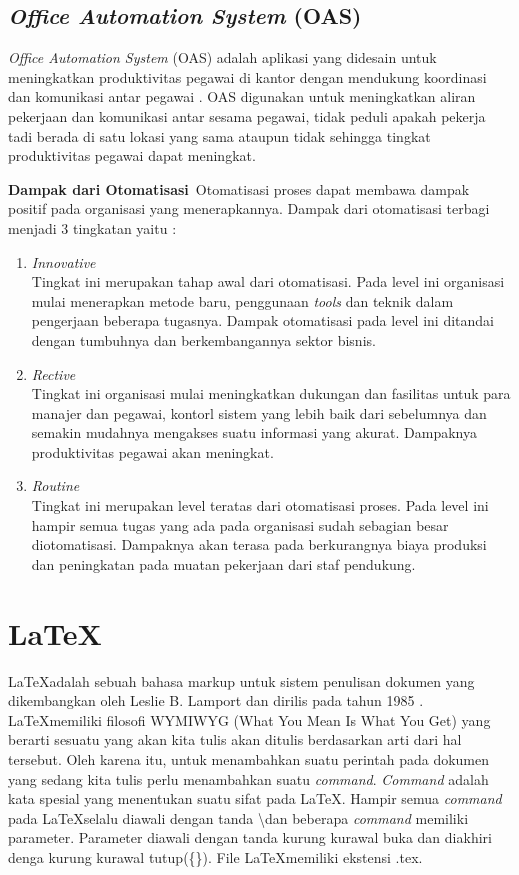 \subsection{\textit{Office Automation System} (OAS)}
\label{sec:oas}
\textit{Office Automation System} (OAS) adalah aplikasi yang didesain untuk meningkatkan produktivitas pegawai di kantor dengan mendukung koordinasi dan komunikasi antar pegawai \cite{Laudon:1996}. OAS digunakan untuk meningkatkan aliran pekerjaan dan komunikasi antar sesama pegawai, tidak peduli apakah pekerja tadi berada di satu lokasi yang sama ataupun tidak sehingga tingkat produktivitas pegawai dapat meningkat.

\textbf{Dampak dari Otomatisasi}\
Otomatisasi proses dapat membawa dampak positif pada organisasi yang menerapkannya. Dampak dari otomatisasi terbagi menjadi 3 tingkatan yaitu \cite{Susan:1982}: 
\begin{enumerate}
	\item \textit{Innovative}\\
	Tingkat ini merupakan tahap awal dari otomatisasi. Pada level ini organisasi mulai menerapkan metode baru, penggunaan \textit{tools} dan teknik dalam pengerjaan beberapa tugasnya. Dampak otomatisasi pada level ini ditandai dengan tumbuhnya dan berkembangannya sektor bisnis.
	\item \textit{Rective}\\
	Tingkat ini organisasi mulai meningkatkan dukungan dan fasilitas untuk para manajer dan pegawai, kontorl sistem yang lebih baik dari sebelumnya dan semakin mudahnya mengakses suatu informasi yang akurat. Dampaknya produktivitas pegawai akan meningkat.
	\item \textit{Routine}\\
	Tingkat ini merupakan level teratas dari otomatisasi proses. Pada level ini hampir semua tugas yang ada pada organisasi sudah sebagian besar diotomatisasi. Dampaknya akan terasa pada berkurangnya biaya produksi dan peningkatan pada muatan pekerjaan dari staf pendukung.
\end{enumerate}
 
\section{\LaTeX}
\label{sec:latex}
\LaTeX adalah sebuah bahasa markup untuk sistem penulisan dokumen yang dikembangkan oleh Leslie B. Lamport dan dirilis pada tahun 1985 \cite{Lamport:1994} . \LaTeX memiliki filosofi WYMIWYG (What You Mean Is What You Get) yang berarti sesuatu yang akan kita tulis akan ditulis berdasarkan arti dari hal tersebut. Oleh karena itu, untuk menambahkan suatu perintah pada dokumen yang sedang kita tulis perlu menambahkan suatu \textit{command}. \textit{Command} adalah kata spesial yang menentukan suatu sifat pada \LaTeX. Hampir semua \textit{command} pada \LaTeX selalu diawali dengan tanda \textbackslash dan beberapa \textit{command} memiliki parameter. Parameter diawali dengan tanda kurung kurawal buka dan diakhiri denga kurung kurawal tutup(\{\}). File \LaTeX memiliki ekstensi .tex.  

